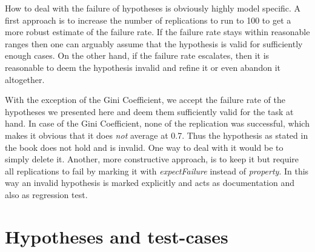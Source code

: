 %
%		
%	
%
%
%

How to deal with the failure of hypotheses is obviously highly model specific. A first approach is to increase the number of replications to run to 100 to get a more robust estimate of the failure rate. If the failure rate stays within reasonable ranges then one can arguably assume that the hypothesis is valid for sufficiently enough cases. On the other hand, if the failure rate escalates, then it is reasonable to deem the hypothesis invalid and refine it or even abandon it altogether.

With the exception of the Gini Coefficient, we accept the failure rate of the hypotheses we presented here and deem them sufficiently valid for the task at hand. In case of the Gini Coefficient, none of the replication was successful, which makes it obvious that it does \textit{not} average at 0.7. Thus the hypothesis as stated in the book does not hold and is invalid. One way to deal with it would be to simply delete it. Another, more constructive approach, is to keep it but require all replications to fail by marking it with \textit{expectFailure} instead of \textit{property}. In this way an invalid hypothesis is marked explicitly and acts as documentation and also as regression test.

\section{Hypotheses and test-cases}
\label{sec:hypotheses_testcases}

